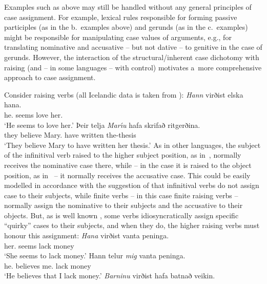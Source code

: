 \documentclass[output=paper]{langsci/langscibook}
\begin{document}
Examples such as above may still be handled without any general principles of case assignment.  For example, lexical rules responsible for forming passive participles (as in the b.~examples above) and gerunds (as in the c.~examples) might be responsible for manipulating case values of arguments, e.g., for translating nominative and accusative – but not dative – to genitive in the case of gerunds.  However, the interaction of the structural/inherent case dichotomy with raising (and – in some languages – with control) motivates a~more comprehensive approach to case assignment.

Consider  raising verbs (all Icelandic data is taken from \citealt[304–305]{SKG92}):
\eal
\label{isl:nom}
\ex
\gll  \textit{Hann} virðist elska hana.\\
      he.\NOM{} seems love\INF{} her.\ACC{}\\
\glt  `He seems to love her.'
\ex
\gll  Þeir telja \textit{Mar{\'\i}u} hafa skrifað ritgerðina. \\
      they believe Mary.\ACC{} have\INF{} written the-thesis\\
\glt    `They believe Mary to have written her thesis.'
\zl
As in other languages, the subject of the infinitival verb raised to the higher subject position, as in~, normally receives the nominative case there, while – in the case it is raised to the object position, as in~ – it normally receives the accusative case.  This could be easily modelled in accordance with the suggestion of \citet[30]{ps2} that infinitival verbs do not assign case to their subjects, while finite verbs – in this case finite raising verbs – normally assign the nominative to their subjects and the accusative to their objects.  But, as is well known \citep{Andrews82a-u-kopiert,zae:mal:83,ZMT85a}, some  verbs idiosyncratically assign specific ``quirky'' cases to their subjects, and when they do, the higher raising verbs must honour this assignment:
\eal
\label{isl:acc}
\ex
\gll   \textit{Hana} virðist vanta peninga. \\
      her.\ACC{} seems lack\INF{} money\\
\glt    `She seems to lack money.'
\ex
 \gll   Hann telur \textit{mig} vanta peninga. \\
      he.\NOM{} believes me.\ACC{} lack\INF{} money\\
\glt    `He believes that I lack money.'
\zl
\eal
\label{isl:dat}
\ex
\gll   \textit{Barninu} virðist hafa batnað veikin. \\
\end{document}
